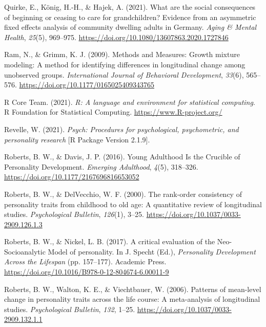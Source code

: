 \documentclass[
  english,
  man,floatsintext]{apa7}
\begin{document}
\leavevmode\hypertarget{ref-quirkeWhatAreSocial2021}{}%
Quirke, E., König, H.-H., \& Hajek, A. (2021). What are the social consequences of beginning or ceasing to care for grandchildren? Evidence from an asymmetric fixed effects analysis of community dwelling adults in Germany. \emph{Aging \& Mental Health}, \emph{25}(5), 969--975. \url{https://doi.org/10.1080/13607863.2020.1727846}

\leavevmode\hypertarget{ref-ramMethodsMeasuresGrowth2009}{}%
Ram, N., \& Grimm, K. J. (2009). Methods and Measures: Growth mixture modeling: A method for identifying differences in longitudinal change among unobserved groups. \emph{International Journal of Behavioral Development}, \emph{33}(6), 565--576. \url{https://doi.org/10.1177/0165025409343765}

\leavevmode\hypertarget{ref-R-base}{}%
R Core Team. (2021). \emph{R: A language and environment for statistical computing}. R Foundation for Statistical Computing. \url{https://www.R-project.org/}

\leavevmode\hypertarget{ref-R-psych}{}%
Revelle, W. (2021). \emph{Psych: Procedures for psychological, psychometric, and personality research} {[}R Package Version 2.1.9{]}.

\leavevmode\hypertarget{ref-robertsYoungAdulthoodCrucible2016}{}%
Roberts, B. W., \& Davis, J. P. (2016). Young Adulthood Is the Crucible of Personality Development. \emph{Emerging Adulthood}, \emph{4}(5), 318--326. \url{https://doi.org/10.1177/2167696816653052}

\leavevmode\hypertarget{ref-robertsRankorderConsistencyPersonality2000}{}%
Roberts, B. W., \& DelVecchio, W. F. (2000). The rank-order consistency of personality traits from childhood to old age: A quantitative review of longitudinal studies. \emph{Psychological Bulletin}, \emph{126}(1), 3--25. \url{https://doi.org/10.1037/0033-2909.126.1.3}

\leavevmode\hypertarget{ref-robertsCriticalEvaluationNeoSocioanalytic2017}{}%
Roberts, B. W., \& Nickel, L. B. (2017). A critical evaluation of the Neo-Socioanalytic Model of personality. In J. Specht (Ed.), \emph{Personality Development Across the Lifespan} (pp. 157--177). Academic Press. \url{https://doi.org/10.1016/B978-0-12-804674-6.00011-9}

\leavevmode\hypertarget{ref-robertsPatternsMeanlevelChange2006a}{}%
Roberts, B. W., Walton, K. E., \& Viechtbauer, W. (2006). Patterns of mean-level change in personality traits across the life course: A meta-analysis of longitudinal studies. \emph{Psychological Bulletin}, \emph{132}, 1--25. \url{https://doi.org/10.1037/0033-2909.132.1.1}
\end{document}
